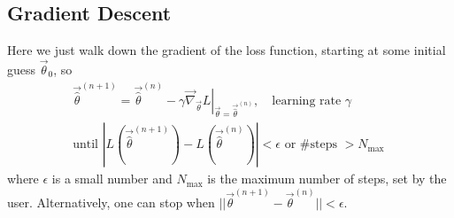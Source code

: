 \subsection{Gradient Descent}
Here we just walk down the gradient of the loss function, starting at some initial guess $\vec{\theta}_0$, so
\begin{equation}
    \begin{gathered}
        \vec{\hat{\theta}}^{(n+1)}=\vec{\hat{\theta}}^{(n)}-\left.\gamma \vec{\nabla}_{\vec{\theta}} L\right|_{\vec{\theta}=\vec{\widehat{\theta}}^{(n)}}, \quad \text{learning rate } \gamma \\
        \text{until } \left|L\left(\vec{\hat{\theta}}^{(n+1)}\right)-L\left(\vec{\hat{\theta}}^{(n)}\right)\right|<\epsilon \text{ or \# steps } >N_{\text {max }}
    \end{gathered}
\end{equation}
where $\epsilon$ is a small number and $N_{\text{max}}$ is the maximum number of steps, set by
the user. Alternatively, one can stop when $||\vec{\theta}^{(n+1)} - \vec{\theta}^{(n)}|| < \epsilon$.


